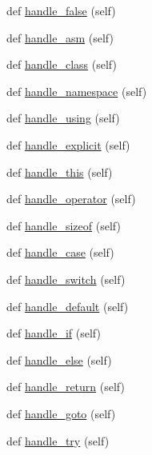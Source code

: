 \begin{DoxyCompactItemize}
def \mbox{\hyperlink{classcpp_1_1ast_1_1AstBuilder_afe125e384026baf74b55593b254fc10c}{handle\+\_\+false}} (self)
\item 
def \mbox{\hyperlink{classcpp_1_1ast_1_1AstBuilder_acf6ec42d567cd85a9bad77772c381a4e}{handle\+\_\+asm}} (self)
\item 
def \mbox{\hyperlink{classcpp_1_1ast_1_1AstBuilder_a93bd39632593bec36972355b7e1893e0}{handle\+\_\+class}} (self)
\item 
def \mbox{\hyperlink{classcpp_1_1ast_1_1AstBuilder_ae6dde01c5f9ac7ba3b14dff01cac66e4}{handle\+\_\+namespace}} (self)
\item 
def \mbox{\hyperlink{classcpp_1_1ast_1_1AstBuilder_a785563f31bc3ed9559d9ce2854a83f1b}{handle\+\_\+using}} (self)
\item 
def \mbox{\hyperlink{classcpp_1_1ast_1_1AstBuilder_a568860050542b53d3df9cf479f2a5e1c}{handle\+\_\+explicit}} (self)
\item 
def \mbox{\hyperlink{classcpp_1_1ast_1_1AstBuilder_ad96a39776b5439fa9a5c2989f8da20cd}{handle\+\_\+this}} (self)
\item 
def \mbox{\hyperlink{classcpp_1_1ast_1_1AstBuilder_a7ca1318675b9eff41cb4a838d63eb6e6}{handle\+\_\+operator}} (self)
\item 
def \mbox{\hyperlink{classcpp_1_1ast_1_1AstBuilder_acfd733ff9115e3292bea10e160bb6184}{handle\+\_\+sizeof}} (self)
\item 
def \mbox{\hyperlink{classcpp_1_1ast_1_1AstBuilder_ac4f02e1ba7df670086e4c9dabdb21458}{handle\+\_\+case}} (self)
\item 
def \mbox{\hyperlink{classcpp_1_1ast_1_1AstBuilder_a1dffcdf7154158461a652c5b885bfa19}{handle\+\_\+switch}} (self)
\item 
def \mbox{\hyperlink{classcpp_1_1ast_1_1AstBuilder_a6bf895d948d231ffcd058df7af05d0be}{handle\+\_\+default}} (self)
\item 
def \mbox{\hyperlink{classcpp_1_1ast_1_1AstBuilder_a39f2561dfcf36485b2050dff258ece2b}{handle\+\_\+if}} (self)
\item 
def \mbox{\hyperlink{classcpp_1_1ast_1_1AstBuilder_aeb676b03467a93454be018ac243f89a2}{handle\+\_\+else}} (self)
\item 
def \mbox{\hyperlink{classcpp_1_1ast_1_1AstBuilder_a8330d1f34d40b0e82495ec794575289d}{handle\+\_\+return}} (self)
\item 
def \mbox{\hyperlink{classcpp_1_1ast_1_1AstBuilder_a8504d788bb1541ee581918d52d1f4132}{handle\+\_\+goto}} (self)
\item 
def \mbox{\hyperlink{classcpp_1_1ast_1_1AstBuilder_a6c7998f3fdcd046718ff809dbe257645}{handle\+\_\+try}} (self)

\end{DoxyCompactItemize}
